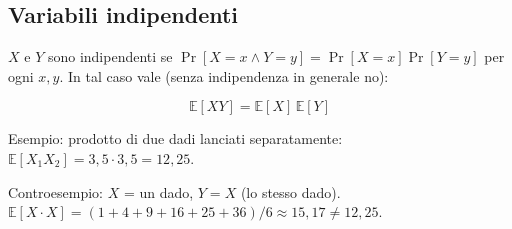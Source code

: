 \subsection{Variabili indipendenti}

\(X\) e \(Y\) sono indipendenti se \(\Pr[X=x \wedge Y=y] = \Pr[X=x]\Pr[Y=y]\) per ogni \(x, y\). In tal caso vale (senza indipendenza in generale no):

\[
\mathbb{E}[XY] = \mathbb{E}[X]\,\mathbb{E}[Y]
\]

\begin{esempio}

Esempio: prodotto di due dadi lanciati separatamente: \(\mathbb{E}[X_1 X_2] = 3{,}5 \cdot 3{,}5 = 12{,}25\).

Controesempio: \(X\) = un dado, \(Y = X\) (lo stesso dado). \(\mathbb{E}[X \cdot X] = (1+4+9+16+25+36)/6 \approx 15{,}17 \ne 12{,}25\).

\end{esempio}
